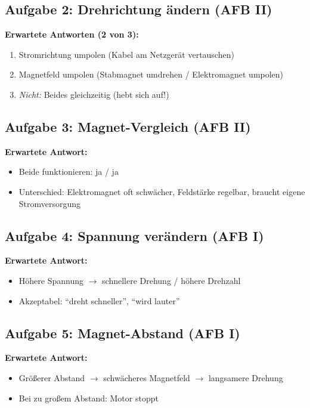 \documentclass[11pt, a4paper]{article}
\begin{document}
\subsection*{Aufgabe 2: Drehrichtung ändern (AFB II)}

\textbf{Erwartete Antworten (2 von 3):}
\begin{enumerate}[noitemsep]
    \item Stromrichtung umpolen (Kabel am Netzgerät vertauschen)
    \item Magnetfeld umpolen (Stabmagnet umdrehen / Elektromagnet umpolen)
    \item \textit{Nicht:} Beides gleichzeitig (hebt sich auf!)
\end{enumerate}

\subsection*{Aufgabe 3: Magnet-Vergleich (AFB II)}

\textbf{Erwartete Antwort:}
\begin{itemize}[noitemsep]
    \item Beide funktionieren: ja / ja
    \item Unterschied: Elektromagnet oft schwächer, Feldstärke regelbar, braucht eigene Stromversorgung
\end{itemize}

\subsection*{Aufgabe 4: Spannung verändern (AFB I)}

\textbf{Erwartete Antwort:}
\begin{itemize}[noitemsep]
    \item Höhere Spannung $\rightarrow$ schnellere Drehung / höhere Drehzahl
    \item Akzeptabel: ``dreht schneller'', ``wird lauter''
\end{itemize}

\subsection*{Aufgabe 5: Magnet-Abstand (AFB I)}

\textbf{Erwartete Antwort:}
\begin{itemize}[noitemsep]
    \item Größerer Abstand $\rightarrow$ schwächeres Magnetfeld $\rightarrow$ langsamere Drehung
    \item Bei zu großem Abstand: Motor stoppt
\end{itemize}
\end{document}
